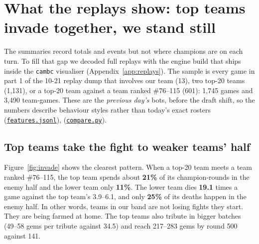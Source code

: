 \documentclass[11pt,a4paper]{article}
\newcommand{\src}[2]{{\small(\href{#1}{\textcolor{cTop}{\texttt{#2}}})}}
\newcommand{\viz}{file:///private/tmp/claude-501/-Users-tristanbasri-Desktop-Code-cambridge-battlecode-s2/b3f4cb6b-e46a-405f-957c-42c44c05c8dc/scratchpad/viz2}
\begin{document}
\section{What the replays show: top teams invade together, we stand still}
\label{sec:replays}

The summaries record totals and events but not where champions are on each turn. To fill that gap we decoded full replays with the engine build that ships inside the \texttt{cambc} visualiser (Appendix~\ref{app:replays}). The sample is every game in part 1 of the 10-21 replay dump that involves our team (13), two top-20 teams (1,131), or a top-20 team against a team ranked \#76--115 (601): 1,745 games and 3,490 team-games. These are the \emph{previous day's} bots, before the draft shift, so the numbers describe behaviour styles rather than today's exact rosters \src{\viz/an/features.jsonl}{features.jsonl}, \src{\viz/an/compare.py}{compare.py}.

\subsection{Top teams take the fight to weaker teams' half}

Figure~\ref{fig:invade} shows the clearest pattern. When a top-20 team meets a team ranked \#76--115, the top team spends about \textbf{21\%} of its champion-rounds in the enemy half and the lower team only \textbf{11\%}. The lower team dies \textbf{19.1} times a game against the top team's 3.9--6.1, and only \textbf{25\%} of its deaths happen in the enemy half. In other words, teams in our band are not losing fights they start. They are being farmed at home. The top teams also tribute in bigger batches (49--58 gems per tribute against 34.5) and reach 217--283 gems by round 500 against 141.
\end{document}
